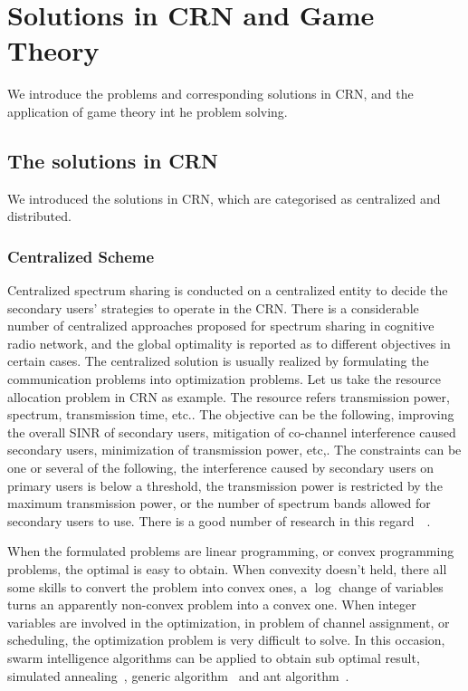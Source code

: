



\section{Solutions in CRN and Game Theory}
\label{gametheory_crn}

We introduce the problems and corresponding solutions in CRN, and the application of game theory int he problem solving.

\subsection{The solutions in CRN}
We introduced the solutions in CRN, which are categorised as centralized and distributed.

\subsubsection{Centralized Scheme}
Centralized spectrum sharing is conducted on a centralized entity to decide the secondary users' strategies to operate in the CRN.
There is a considerable number of centralized approaches proposed for spectrum sharing in cognitive radio network, and the global optimality is reported as to different objectives in certain cases.
%
The centralized solution is usually realized by formulating the communication problems into optimization problems.
Let us take the resource allocation problem in CRN as example.
The resource refers transmission power, spectrum, transmission time, etc..
The objective can be the following, improving the overall SINR of secondary users, mitigation of co-channel interference caused secondary users, minimization of transmission power, etc,.
The constraints can be one or several of the following, the interference caused by secondary users on primary users is below a threshold, the transmission power is restricted by the maximum transmission power, or the number of spectrum bands allowed for secondary users to use.
There is a good number of research in this regard~\cite{resource_allocation_crn_Ahmad_2015}~\cite[Chapter~6]{Han:2008:RAW:1457343}.

When the formulated problems are linear programming, or convex programming problems, the optimal is easy to obtain.
When convexity doesn't held, there all some skills to convert the problem into convex ones, \eg a $\log$ change of variables turns an apparently non-convex problem into a convex one.
When integer variables are involved in the optimization, \eg in problem of channel assignment, or scheduling, the optimization problem is very difficult to solve.
In this occasion, swarm intelligence algorithms can be applied to obtain sub optimal result, \ie simulated annealing~\cite{simulated_annealing_09, Tang20122690}, generic algorithm~\cite{Chen_2010} and ant algorithm~\cite{he_2012}.

